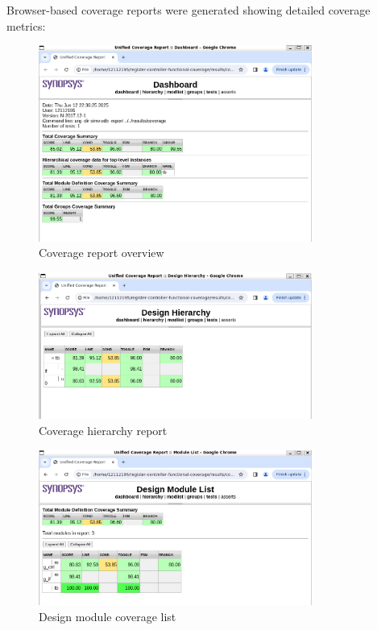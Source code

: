 \documentclass[11pt]{article}
\begin{document}
Browser-based coverage reports were generated showing detailed coverage metrics:

\begin{figure}[h]
\centering
\includegraphics[width=0.8\textwidth]{browser_cov_report_overview.png}
\caption{Coverage report overview}
\end{figure}

\begin{figure}[h]
\centering
\includegraphics[width=0.8\textwidth]{browser_cov_report_hierarchy.png}
\caption{Coverage hierarchy report}
\end{figure}

\begin{figure}[h]
\centering
\includegraphics[width=0.8\textwidth]{browser_cov_report_design_module_list.png}
\caption{Design module coverage list}
\end{figure}
\end{document}
